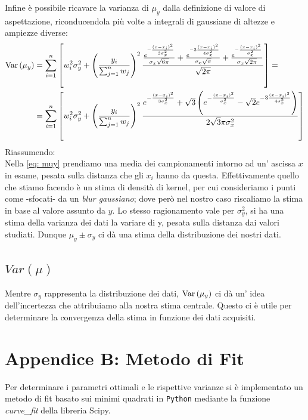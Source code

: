 \documentclass{article}[a4paper, oneside, 11pt]
\begin{document}
Infine è possibile ricavare la varianza di $\mu_y$ dalla definizione di valore
di aspettazione, riconducendola più volte a integrali di gaussiane di altezze
e ampiezze diverse:
\begin{align}
	\text{Var}\left(\mu_y\right) &= \sum_{i=1}^{n} \left[w_i^2 \sigma_y^2 + 
	\left(\frac{y_i}{\sum_{j=1}^{n} w_j}  \right)^2 \frac{
	\frac{e^{-\frac{(x-x_i)^2}{3 \sigma_x^2}}} {\sigma_x \sqrt{6 \pi} } +
	\frac{e^{-3\frac{(x-x_i)^2}{4 \sigma_x^2}}} {\sigma_x \sqrt{\pi} } +
	\frac{e^{-\frac{(x-x_i)^2}{\sigma_x^2}}} {\sigma_x \sqrt{2 \pi}}
	} {\sqrt{2 \pi}} \right] =\\
        &= \sum_{i=1}^{n} \left[w_i^2 \sigma_y^2 + 
	\left(\frac{y_i}{\sum_{j=1}^{n} w_j}  \right)^2 \frac{
	e^{-\frac{(x-x_i)^2}{3 \sigma_x^2}} +  
	\sqrt{3}\left( e^{-\frac{(x-x_i)^2}{\sigma_x^2}} -
	\sqrt{2} e^{-3 \frac{(x-x_i)^2}{4 \sigma_x^2}} \right)
	} {2 \sqrt{3}\pi \sigma_x^2} \right]
\end{align}
Riassumendo:\\
Nella \eqref{eq: muy} prendiamo una media dei campionamenti intorno ad un'
ascissa $x$ in esame, pesata sulla distanza che gli $x_i$ hanno da questa. 
Effettivamente quello che stiamo facendo è un stima di densità di kernel,
per cui consideriamo i punti come -sfocati- da un \emph{blur gaussiano};
dove però nel nostro caso riscaliamo la stima in base al valore assunto da $y$.
Lo stesso ragionamento vale per $\sigma_y^2$, si ha una stima della varianza
dei dati la variare di y, pesata sulla distanza dai valori studiati. Dunque
$\mu_y \pm \sigma_y$ ci dà una stima della distribuzione dei nostri dati.
\subsection{$Var(\mu)$}
Mentre $\sigma_y$ rappresenta la distribuzione dei dati, $\text{Var}\left(\mu_y\right)$ ci dà un' 
idea dell’incertezza che attribuiamo alla nostra stima centrale. Questo ci è
utile per determinare la convergenza della stima in funzione dei dati acquisiti.
\section{Appendice B: Metodo di Fit}
Per determinare i parametri ottimali e le rispettive varianze si \`e
implementato un metodo di fit basato sui minimi quadrati in \verb+Python+
mediante la funzione \emph{curve\_fit} della libreria Scipy\cite{scipy}.
\medskip


\end{document}
